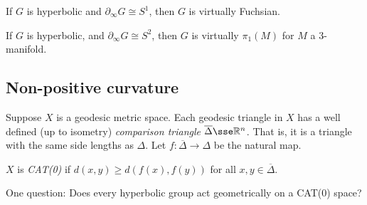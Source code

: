 \documentclass{article}
\begin{document}
\begin{theorem}
    If \(G\) is hyperbolic and \(\partial_\infty G \cong S^1\), then \(G\) is virtually Fuchsian.    
\end{theorem}

\begin{conjecture}
    [Cannon] If \(G\) is hyperbolic, and \(\partial_\infty G \cong S^2\), then \(G\) is virtually \(\pi_1(M)\) for \(M\) a \(3\)-manifold.
\end{conjecture}

\subsection*{Non-positive curvature}

\begin{definition}
    Suppose \(X\) is a geodesic metric space. Each geodesic triangle in \(X\) has a well defined (up to isometry) \emph{comparison triangle} \(\overline\Delta \sse \R^n\). That is, it is a triangle with the same side lengths as \(\Delta\). Let \(f : \overline\Delta \to \Delta\) be the natural map.

    \(X\) is \emph{CAT(0)} if \(d(x, y) \ge d(f(x), f(y))\) for all \(x, y \in \overline\Delta\).
\end{definition}

One question: Does every hyperbolic group act geometrically on a CAT(0) space?
\end{document}
